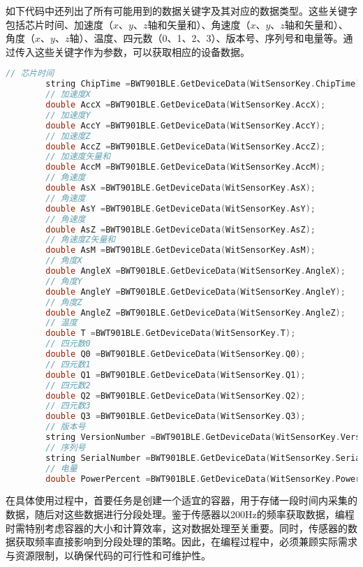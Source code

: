 \documentclass[12pt,hyperref,a4paper,UTF8]{ctexart}
\begin{document}
	如下代码中还列出了所有可能用到的数据关键字及其对应的数据类型。这些关键字包括芯片时间、加速度（\(x\)、\(y\)、\(z\)轴和矢量和）、角速度（\(x\)、\(y\)、\(z\)轴和矢量和）、角度（\(x\)、\(y\)、\(z\)轴）、温度、四元数（0、1、2、3）、版本号、序列号和电量等。通过传入这些关键字作为参数，可以获取相应的设备数据。
	\begin{lstlisting}[language=c++]
		// 芯片时间
		string ChipTime =BWT901BLE.GetDeviceData(WitSensorKey.ChipTime);
		// 加速度X
		double AccX =BWT901BLE.GetDeviceData(WitSensorKey.AccX);
		// 加速度Y
		double AccY =BWT901BLE.GetDeviceData(WitSensorKey.AccY);
		// 加速度Z
		double AccZ =BWT901BLE.GetDeviceData(WitSensorKey.AccZ);
		// 加速度矢量和
		double AccM =BWT901BLE.GetDeviceData(WitSensorKey.AccM);
		// 角速度
		double AsX =BWT901BLE.GetDeviceData(WitSensorKey.AsX);
		// 角速度
		double AsY =BWT901BLE.GetDeviceData(WitSensorKey.AsY);
		// 角速度
		double AsZ =BWT901BLE.GetDeviceData(WitSensorKey.AsZ);
		// 角速度Z矢量和
		double AsM =BWT901BLE.GetDeviceData(WitSensorKey.AsM);
		// 角度X
		double AngleX =BWT901BLE.GetDeviceData(WitSensorKey.AngleX);
		// 角度Y
		double AngleY =BWT901BLE.GetDeviceData(WitSensorKey.AngleY);
		// 角度Z
		double AngleZ =BWT901BLE.GetDeviceData(WitSensorKey.AngleZ);
		// 温度
		double T =BWT901BLE.GetDeviceData(WitSensorKey.T);
		// 四元数0
		double Q0 =BWT901BLE.GetDeviceData(WitSensorKey.Q0);
		// 四元数1
		double Q1 =BWT901BLE.GetDeviceData(WitSensorKey.Q1);
		// 四元数2
		double Q2 =BWT901BLE.GetDeviceData(WitSensorKey.Q2);
		// 四元数3
		double Q3 =BWT901BLE.GetDeviceData(WitSensorKey.Q3);
		// 版本号
		string VersionNumber =BWT901BLE.GetDeviceData(WitSensorKey.VersionNumber);
		// 序列号
		string SerialNumber =BWT901BLE.GetDeviceData(WitSensorKey.SerialNumber);
		// 电量
		double PowerPercent =BWT901BLE.GetDeviceData(WitSensorKey.PowerPercent);
	\end{lstlisting}
	
	在具体使用过程中，首要任务是创建一个适宜的容器，用于存储一段时间内采集的数据，随后对这些数据进行分段处理。鉴于传感器以200Hz的频率获取数据，编程时需特别考虑容器的大小和计算效率，这对数据处理至关重要。同时，传感器的数据获取频率直接影响到分段处理的策略。因此，在编程过程中，必须兼顾实际需求与资源限制，以确保代码的可行性和可维护性。
	
\end{document}

